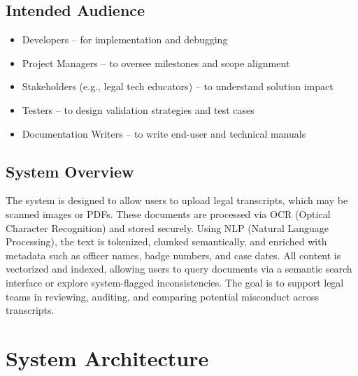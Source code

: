 \documentclass[11pt]{article}
\begin{document}
\subsection{Intended Audience}
\begin{itemize}
\item Developers – for implementation and debugging
\item Project Managers – to oversee milestones and scope alignment
\item Stakeholders (e.g., legal tech educators) – to understand solution impact
\item Testers – to design validation strategies and test cases
\item Documentation Writers – to write end-user and technical manuals
\end{itemize}

\subsection{System Overview}
The system is designed to allow users to upload legal transcripts, which may be scanned images or PDFs. These documents are processed via OCR (Optical Character Recognition) and stored securely. Using NLP (Natural Language Processing), the text is tokenized, chunked semantically, and enriched with metadata such as officer names, badge numbers, and case dates. All content is vectorized and indexed, allowing users to query documents via a semantic search interface or explore system-flagged inconsistencies. The goal is to support legal teams in reviewing, auditing, and comparing potential misconduct across transcripts.

\newpage
\section{System Architecture}
\end{document}
